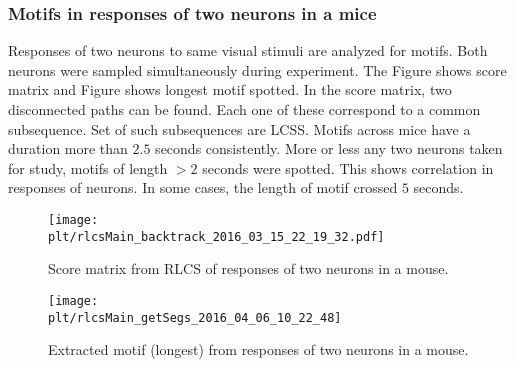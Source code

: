 \documentclass[MTech]{iitmdiss}
\newcommand{\plt}{thesis_plots}
\begin{document}
\subsubsection{Motifs in responses of two neurons in a mice} %
\label{ssub:motifs_in_responses_of_two_neurons_in_a_mice}
Responses of two neurons to same visual stimuli are analyzed for motifs. Both neurons were sampled simultaneously during experiment. The Figure shows score matrix and Figure shows longest motif spotted. In the score matrix, two disconnected paths can be found. Each one of these correspond to a common subsequence. Set of such subsequences are LCSS. Motifs across mice have a duration more than $2.5$ seconds  consistently. More or less any two neurons taken for study, motifs of length $> 2$ seconds were spotted. This shows correlation in responses of neurons. In some cases, the length of motif crossed $5$ seconds.
\begin{figure}
    \centering
    \texttt{[image: \\plt/rlcsMain\_backtrack\_2016\_03\_15\_22\_19\_32.pdf]}
    \caption{Score matrix from RLCS of responses of two neurons in a mouse.}
    \label{img:score_neuron}
\end{figure}
\begin{figure}
    \centering
    \texttt{[image: \\plt/rlcsMain\_getSegs\_2016\_04\_06\_10\_22\_48]}
    \caption{Extracted motif (longest) from responses of two neurons in a mouse.}
    \label{img:motif_neuron}
\end{figure}
\end{document}
